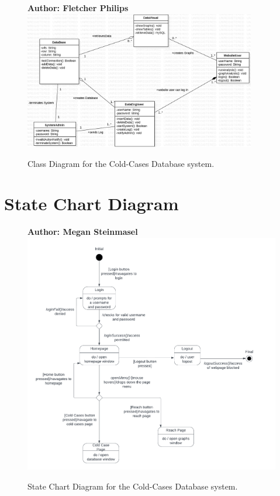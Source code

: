 \documentclass[11pt]{article}
\begin{document}
\begin{figure}[!ht]
\centering
\textbf{Author: Fletcher Philips}
	\includegraphics[width=0.9\textwidth]{./Class Diagrams/ColdCaseClassDiagram.png}\\
	\caption{Class Diagram for the Cold-Cases Database system.}
	\label{fig:class_diagram}
\end{figure}
\clearpage



\section*{State Chart Diagram}

\begin{figure}[!ht]
\centering
\textbf{Author: Megan Steinmasel}
	\includegraphics[width=.95\textwidth]{./State Chart/C.C. Statechart}\\
	\caption{State Chart Diagram for the Cold-Cases Database system.}
	\label{fig:state_chart_diagram}
\end{figure}
\clearpage
\end{document}
